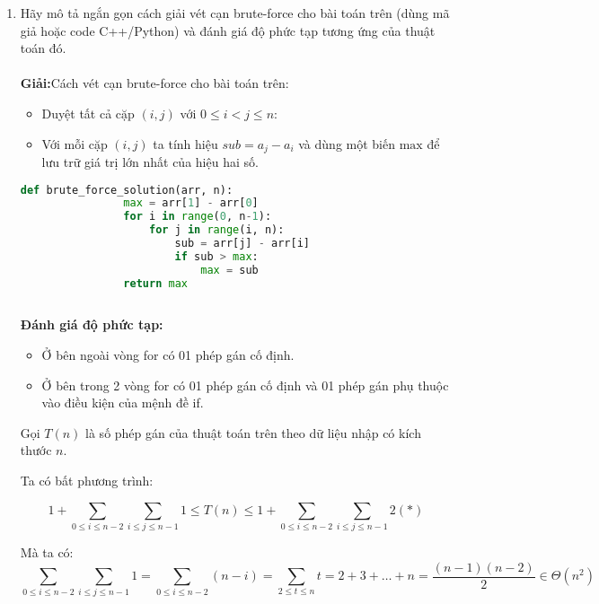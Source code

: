 \documentclass[12pt,a4paper]{article}
\begin{document}
        \begin{enumerate}[label=\textbf{Câu 2.\arabic*},leftmargin=*]
    \item  Hãy mô tả ngắn gọn cách giải vét cạn brute-force cho bài toán trên (dùng mã giả
          hoặc code C++/Python) và đánh giá độ phức tạp tương ứng của thuật toán đó.\\ \\
          \textbf{Giải:}Cách vét cạn brute-force cho bài toán trên:

          \begin{itemize}
              \item Duyệt tất cả cặp $(i,j)$ với $0\leq i < j\leq n$:
              \item Với mỗi cặp $(i,j)$ ta tính hiệu $sub = a_j - a_i$ và dùng một biến
                    $\text{max}$ để lưu trữ giá trị lớn nhất của hiệu hai số.
          \end{itemize}
          \begin{lstlisting}[language=Python, ]
            def brute_force_solution(arr, n):
                max = arr[1] - arr[0]
                for i in range(0, n-1):
                    for j in range(i, n):
                        sub = arr[j] - arr[i]
                        if sub > max:
                            max = sub
                return max
            
            \end{lstlisting}
          \textbf{Đánh giá độ phức tạp:}
          \begin{itemize}[label=$\bullet$]
              \item Ở bên ngoài vòng for có 01 phép gán cố định.
              \item Ở bên trong 2 vòng for có 01 phép gán cố định và 01 phép gán phụ thuộc vào điều kiện của mệnh đề if.
          \end{itemize}
          Gọi $T(n)$ là số phép gán của thuật toán trên theo dữ liệu nhập có kích thước $n$.

          Ta có bất phương trình:

          $$ 1+\sum_{0 \leq i \leq n-2} \sum_{i \leq j \leq n-1} 1 \leq T(n) \leq 1 + \sum_{0 \leq i \leq n-2}\sum_{i \leq j \leq n-1} 2(*)$$

          Mà ta có: $$\sum_{0 \leq i \leq n-2}\sum_{i \leq j \leq n-1} 1 = \sum_{0 \leq i
                  \leq n-2} (n-i) = \sum_{2 \leq t \leq n} t = 2 + 3 + \dots + n =
              \frac{(n-1)(n-2)}{2} \in \Theta(n^2)$$


\end{enumerate}
\end{document}
